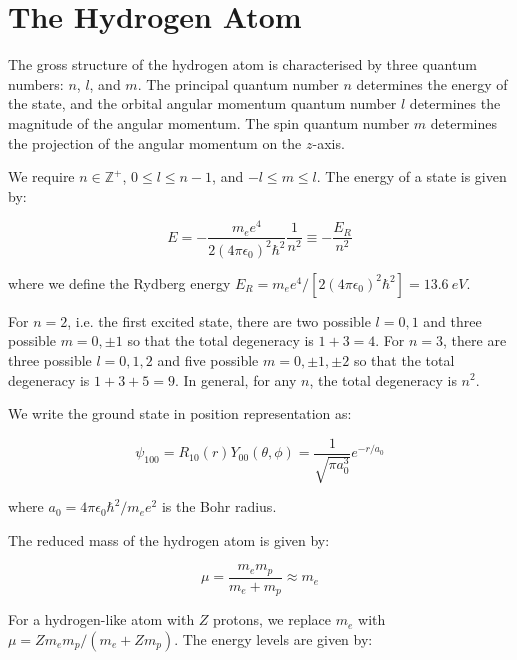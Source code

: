 \documentclass[12pt]{article}
\begin{document}



\pagebreak
\section*{The Hydrogen Atom}


The gross structure of the hydrogen atom is characterised by three quantum numbers: $n$, $l$, and $m$. The principal quantum number $n$ determines the energy of the state, and the orbital angular momentum quantum number $l$ determines the magnitude of the angular momentum. The spin quantum number $m$ determines the projection of the angular momentum on the $z$-axis.

We require $n \in \mathbb{Z}^+$, $0 \leq l \leq n - 1$, and $-l \leq m \leq l$. The energy of a state is given by:

\begin{equation}
    E = - \frac{m_{e} e^{4}}{2 (4 \pi \epsilon_{0})^{2} \hbar^{2}} \frac{1}{n^{2}} \equiv - \frac{E_{R}}{n^{2}}
\end{equation}

where we define the Rydberg energy $E_{R} = m_{e} e^{4}/[2 (4 \pi \epsilon_{0})^{2} \hbar^{2}]= \qty{13.6}{eV}$.

For $n = 2$, i.e. the first excited state, there are two possible $l = 0, 1$ and three possible $m = 0, \pm 1$ so that the total degeneracy is $1 + 3 = 4$. For $n = 3$, there are three possible $l = 0, 1, 2$ and five possible $m = 0, \pm 1, \pm 2$ so that the total degeneracy is $1 + 3 + 5 = 9$. In general, for any $n$, the total degeneracy is $n^{2}$.

We write the ground state in position representation as:

\begin{equation}
    \psi_{100} = R_{10}(r) Y_{00}(\theta, \phi) = \frac{1}{\sqrt{\pi a_{0}^{3}}} e^{-r/a_{0}}
\end{equation}

where $a_{0} = 4 \pi \epsilon_{0} \hbar^{2}/m_{e} e^{2}$ is the Bohr radius.

The reduced mass of the hydrogen atom is given by:

\begin{equation}
    \mu = \frac{m_{e} m_{p}}{m_{e} + m_{p}} \approx m_{e}
\end{equation}

For a hydrogen-like atom with $Z$ protons, we replace $m_{e}$ with $\mu = Zm_{e} m_{p} /(m_{e} + Z m_{p})$. The energy levels are given by:
\end{document}
